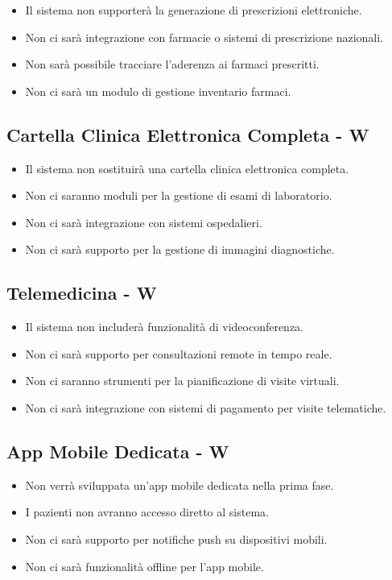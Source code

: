 \documentclass[12pt,a4paper,oneside]{report}
\begin{document}
\begin{itemize}
    \item Il sistema non supporterà la generazione di prescrizioni elettroniche.
    \item Non ci sarà integrazione con farmacie o sistemi di prescrizione nazionali.
    \item Non sarà possibile tracciare l'aderenza ai farmaci prescritti.
    \item Non ci sarà un modulo di gestione inventario farmaci.
\end{itemize}

\subsection{Cartella Clinica Elettronica Completa  - W}

\begin{itemize}
    \item Il sistema non sostituirà una cartella clinica elettronica completa.
    \item Non ci saranno moduli per la gestione di esami di laboratorio.
    \item Non ci sarà integrazione con sistemi ospedalieri.
    \item Non ci sarà supporto per la gestione di immagini diagnostiche.
\end{itemize}

\subsection{Telemedicina  - W}

\begin{itemize}
    \item Il sistema non includerà funzionalità di videoconferenza.
    \item Non ci sarà supporto per consultazioni remote in tempo reale.
    \item Non ci saranno strumenti per la pianificazione di visite virtuali.
    \item Non ci sarà integrazione con sistemi di pagamento per visite telematiche.
\end{itemize}

\subsection{App Mobile Dedicata  - W}

\begin{itemize}
    \item Non verrà sviluppata un'app mobile dedicata nella prima fase.
    \item I pazienti non avranno accesso diretto al sistema.
    \item Non ci sarà supporto per notifiche push su dispositivi mobili.
    \item Non ci sarà funzionalità offline per l'app mobile.
\end{itemize}
\end{document}
